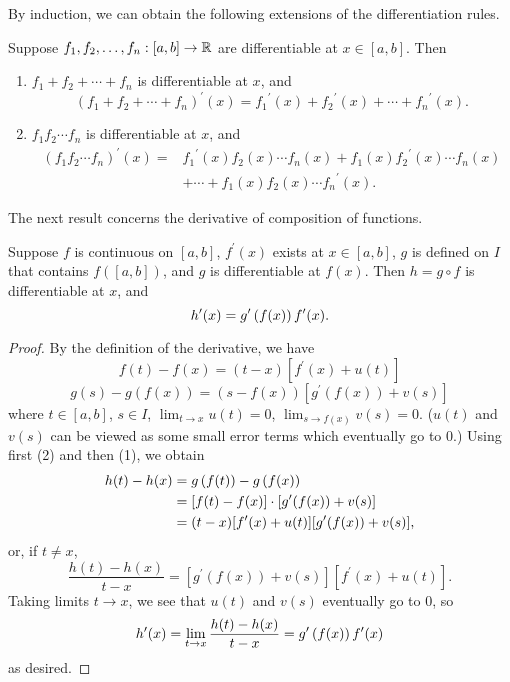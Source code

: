 By induction, we can obtain the following extensions of the differentiation rules.

\begin{corollary*}
Suppose $f_1,f_2,\dots,f_n:[a,b]\to\mathbb R$ are differentiable at $x\in[a,b]$. Then
\begin{enumerate}[label=(\roman*)]
\item $f_1+f_2+\cdots+f_n$ is differentiable at $x$, and
\[(f_1+f_2+\cdots+f_n)^\prime(x)={f_1}^\prime(x)+{f_2}^\prime(x)+\cdots+{f_n}^\prime(x).\]
\item $f_1f_2\cdots f_n$ is differentiable at $x$, and
\begin{align*}
(f_1f_2\cdots f_n)^\prime(x)
=&{f_1}^\prime(x)f_2(x)\cdots f_n(x)+f_1(x){f_2}^\prime(x)\cdots f_n(x)\\
&+\cdots+f_1(x)f_2(x)\cdots {f_n}^\prime(x).
\end{align*}
\end{enumerate}
\end{corollary*}

The next result concerns the derivative of composition of functions.

\begin{lemma}\label{lemma:chain-rule}
Suppose $f$ is continuous on $[a,b]$, $f^\prime(x)$ exists at $x\in[a,b]$, $g$ is defined on $I$ that contains $f([a,b])$, and $g$ is differentiable at $f(x)$. Then $h=g\circ f$ is differentiable at $x$, and
\begin{equation}
h^\prime(x)=g^\prime\left(f(x)\right)f^\prime(x).
\end{equation}
\end{lemma}

\begin{proof}
By the definition of the derivative, we have
\begin{equation*}\tag{1}
f(t)-f(x)=(t-x)[f^\prime(x)+u(t)]
\end{equation*}
\begin{equation*}\tag{2}
g(s)-g(f(x))=(s-f(x))[g^\prime(f(x))+v(s)]
\end{equation*}
where $t\in[a,b]$, $s\in I$, $\displaystyle\lim_{t\to x}u(t)=0$, $\displaystyle\lim_{s\to f(x)}v(s)=0$. ($u(t)$ and $v(s)$ can be viewed as some small error terms which eventually go to $0$.) Using first (2) and then (1), we obtain
\begin{align*}
h(t)-h(x)
&=g\left(f(t)\right)-g\left(f(x)\right)\\
&=[f(t)-f(x)]\cdot[g^\prime(f(x))+v(s)]\\
&=(t-x)[f^\prime(x)+u(t)][g^\prime(f(x))+v(s)],
\end{align*}
or, if $t\neq x$,
\[\frac{h(t)-h(x)}{t-x}=[g^\prime(f(x))+v(s)][f^\prime(x)+u(t)].\]
Taking limits $t\to x$, we see that $u(t)$ and $v(s)$ eventually go to $0$, so
\[h^\prime(x)=\lim_{t\to x}\frac{h(t)-h(x)}{t-x}=g^\prime\left(f(x)\right)f^\prime(x)\]
as desired.
\end{proof}

